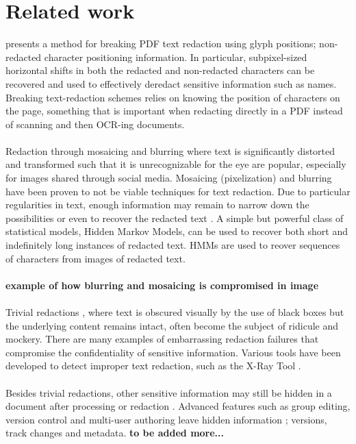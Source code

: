 \chapter{Related work}

\cite{bland2022story} presents a method for breaking PDF text redaction using glyph positions; non-redacted character positioning information. In particular, subpixel-sized horizontal shifts in both the redacted and non-redacted characters can be recovered and used to effectively deredact sensitive information such as names. Breaking text-redaction schemes relies on knowing the position of characters on the page, something that is important when redacting directly in a PDF instead of scanning and then OCR-ing documents. 
\\\\
Redaction through mosaicing and blurring where text is significantly distorted and transformed such that it is unrecognizable for the eye are popular, especially for images shared through social media. Mosaicing (pixelization) and blurring have been proven to not be viable techniques for text redaction. Due to particular regularities in text, enough information may remain to narrow down the possibilities or even to recover the redacted text \cite{hill2016effectiveness}. A simple but powerful class of statistical models, Hidden Markov Models, can be used to recover both short and indefinitely long instances of redacted text. HMMs are used to reover sequences of characters from images of redacted text. 
\\\\
\textbf{example of how blurring and mosaicing is compromised in image}
\\\\
Trivial redactions \cite{forrester2005investigation}, where text is obscured visually by the use of black boxes but the underlying content remains intact, often become the subject of ridicule and mockery. There are many examples of embarrassing redaction failures \cite{failures2019} that compromise the confidentiality of  sensitive information. Various tools have been developed to detect improper text redaction, such as the X-Ray Tool \cite{Xray2021}.
\\\\
Besides trivial redactions, other sensitive information may still be hidden in a document after processing or redaction \cite{muller2021processing}. Advanced features such as group editing, version control and multi-user authoring leave hidden information \cite{forrester2005investigation}; versions, track changes and metadata. \textbf{to be added more...}